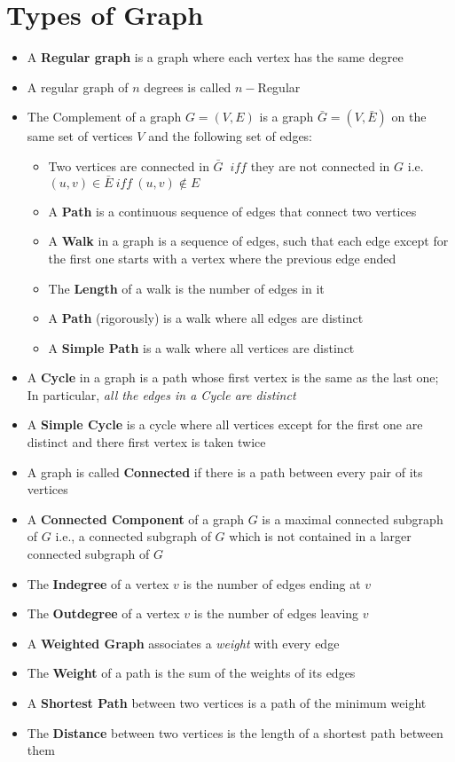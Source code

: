 \section{Types of Graph}
\begin{itemize}
\item A \textbf{Regular graph} is a graph where each vertex has the same degree
\item A regular graph of $n$ degrees is called $n-$Regular
\item  The Complement of a graph $G = (V, E)$ is a graph $\bar{G} = (V, \bar{E})$ on the same set of vertices $V$ and the following set of edges:
\begin{itemize}
\item Two vertices are connected in $\bar{G}$ $\ iff$ they are not connected in $G$ i.e. $(u,v) \in \bar{E} \ iff \  (u,v) \notin E$
\item A \textbf{Path} is a continuous sequence of edges that connect two vertices
\item A \textbf{Walk} in a graph is a sequence of edges, such that each edge except for the first one starts with a vertex where the previous edge ended
\item The \textbf{Length} of a walk is the number of edges in it
\item A \textbf{Path} (rigorously) is a walk where all edges are distinct
\item A \textbf{Simple Path} is a walk where all vertices are distinct
\end{itemize}
\item  A \textbf{Cycle} in a graph is a path whose first vertex is the same as the last one; In particular, \textit{all the edges in a Cycle are
	distinct}
\item A \textbf{Simple Cycle} is a cycle where all vertices
except for the first one are distinct and
there first vertex is taken twice
\item A graph is called \textbf{Connected} if there is a path
between every pair of its vertices
\item  A \textbf{Connected Component} of a graph $G$ is a
maximal connected subgraph of $G$ i.e., a connected subgraph of $G$ which is not
contained in a larger connected subgraph of $G$
\item The \textbf{Indegree} of a vertex $v$ is the number of
edges ending at $v$
\item The \textbf{Outdegree} of a vertex $v$ is the number of
edges leaving $v$
\item A \textbf{Weighted Graph} associates a \textit{weight} with
every edge
\item The \textbf{Weight} of a path is the sum of the
weights of its edges
\item A \textbf{Shortest Path} between two vertices is a
path of the minimum weight
\item The \textbf{Distance} between two vertices is the
length of a shortest path between them
\end{itemize}
